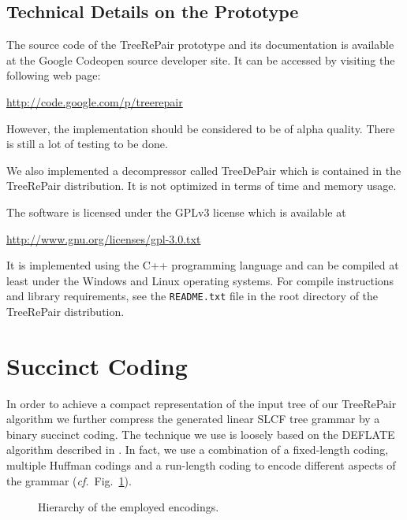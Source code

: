 \documentclass[12pt]{llncs}
\newcommand{\trp}{\mbox{TreeRePair}\xspace}
\newcommand{\cf}{\textit{cf.}~}
\begin{document}
\subsection{Technical Details on the Prototype}

The source code of the \trp prototype and its documentation is available at the Google Code\texttrademark\space open source developer site. It can be accessed by visiting the following web page:
\begin{center}
	\url{http://code.google.com/p/treerepair}
\end{center}
However, the implementation should be considered to be of alpha quality. There is still a lot of testing to be done. 

We also implemented a decompressor called \mbox{TreeDePair} which is contained in the \trp distribution. It is not optimized in terms of time and memory usage.

The software is licensed under the GPLv3 license which is available at
\begin{center}
	\url{http://www.gnu.org/licenses/gpl-3.0.txt}
\end{center}
It is implemented using the C++ programming language and can be compiled at least under the Windows and Linux operating systems. For compile instructions and library requirements, see the \texttt{README.txt} file in the root directory of the \trp distribution.

\section{Succinct Coding}\label{ch:succinctCoding}

In order to achieve a compact representation of the input tree of our \trp algorithm we further compress the generated linear SLCF tree grammar by a binary succinct coding. The technique we use is loosely based on the DEFLATE algorithm described in \cite{Deutsch96deflate}. In fact, we use a combination of a fixed-length coding, multiple Huffman codings and a run-length coding to encode different aspects of the grammar (\cf Fig.~\ref{fig:encodingsHierarchy}).
\begin{figure}[t]
	\centering\small
	\caption{Hierarchy of the employed encodings.}\label{fig:encodingsHierarchy}
\end{figure}
\end{document}
